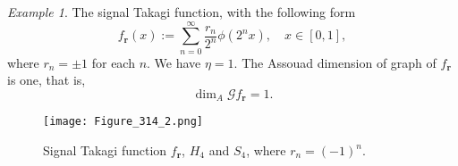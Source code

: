 \documentclass{amsart}
\newtheorem{lem}[thm]{Lemma}
\theoremstyle{definition}
\theoremstyle{remark}
\newtheorem{exam}{Example}[section]
\numberwithin{equation}{section}
\newcommand{\Z}{{\mathbb Z}}
\def\g{\mathcal{G}}
\begin{document}
\begin{exam}
The signal Takagi function\cite{A13}, with the following form
$$
	f_{\mathbf r}(x):=\sum_{n=0}^\infty \frac{r_n}{2^n} \phi(2^n x), \quad x \in [0,1],
$$
where $r_n =\pm 1$ for each $n$.
We have $\eta=1$.
The Assouad dimension of graph of $f_{\mathbf r}$ is one, that is, 
$$ \dim_A \g f_{\mathbf r}=1.$$

\begin{figure}[htbp]
\centering
\texttt{[image: Figure\_314\_2.png]}
\caption{Signal Takagi function $f_{\mathbf r}$, $H_4$ and $S_{4}$, where $r_n=(-1)^n$.}
\end{figure}

\end{exam}

















\end{document}
